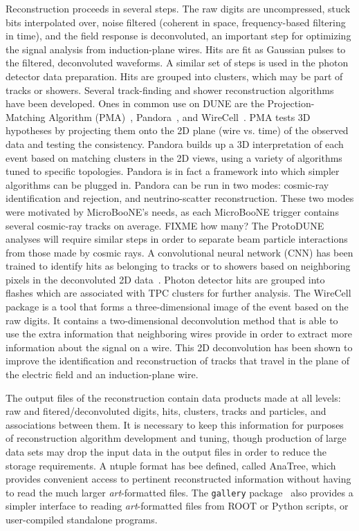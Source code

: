 Reconstruction proceeds in several steps.  The raw digits are uncompressed, stuck bits interpolated over,
noise filtered (coherent in space, frequency-based filtering in time), and the field response is deconvoluted,
an important step for optimizing the signal analysis from induction-plane wires.  Hits are fit as Gaussian
pulses to the filtered, deconvoluted waveforms.  A similar set of steps is used in the photon detector data
preparation.  Hits are grouped into clusters, which may be part of tracks or showers.  Several track-finding
and shower reconstruction algorithms have been developed.  Ones in common use on DUNE are the Projection-Matching
Algorithm (PMA)~\cite{ref:PMA}, Pandora~\cite{Marshall:2015rfa,Acciarri:2017hat}, and WireCell~\cite{ref:wirecell}.  
PMA tests 3D hypotheses by projecting them onto the  2D plane (wire vs. time) of the observed data and 
testing the consistency.  Pandora builds up a 3D interpretation
of each event based on matching clusters in the 2D views, using a variety of algorithms tuned to specific topologies.
Pandora is in fact a framework into which simpler algorithms can be plugged in.  Pandora can be run in two modes:
cosmic-ray identification and rejection, and neutrino-scatter reconstruction.  These two modes were motivated by
MicroBooNE's needs, as each MicroBooNE trigger contains several cosmic-ray tracks on average.  FIXME how many?
The ProtoDUNE analyses will require similar steps in order to separate beam particle interactions from those
made by cosmic rays.  A convolutional neural network (CNN)
has been trained to identify hits as belonging to tracks or to showers based on neighboring pixels in the 
deconvoluted 2D data~\cite{ref:CNN}.  Photon detector hits are grouped into flashes which are associated with
TPC clusters for further analysis.  The WireCell package is a tool that forms a three-dimensional image of the
event based on the raw digits.  It contains a two-dimensional deconvolution method that is able to use
the extra information that neighboring wires provide in order to extract more information about the signal on
a wire.  This 2D deconvolution has been shown to improve the identification and reconstruction of tracks that
travel in the plane of the electric field and an induction-plane wire.


The output files of the reconstruction contain data products made at all levels: raw and fitered/deconvoluted
digits, hits, clusters, tracks and particles, and associations between them.  It is necessary to keep this information
for purposes of reconstruction algorithm development and tuning, though production of large data sets may
drop the input data in the output files in order to reduce the storage requirements.  A ntuple format has bee
defined, called AnaTree, which provides convenient access to pertinent reconstructed information without
having to read the much larger {\it art}-formatted files.  The {\tt gallery} package~\cite{ref:gallery} also provides
a simpler interface to reading {\it art}-formatted files from ROOT or Python scripts, or user-compiled standalone
programs.

